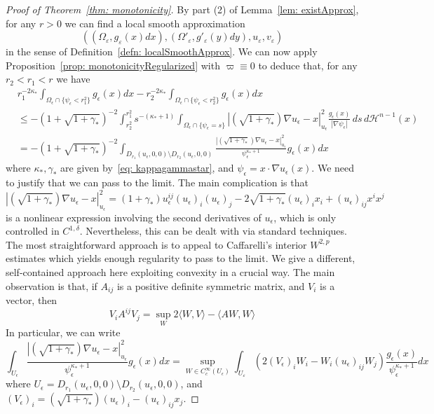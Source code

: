 \documentclass[12pt,reqno]{amsart}
\newcommand{\eps}{\varepsilon}
\numberwithin{equation}{section}
\begin{document}
\begin{proof}[Proof of Theorem~\ref{thm: monotonicity}]
   By part (2) of Lemma~\ref{lem: existApprox}, for any $r>0$ we can find a local smooth approximation 
   \[
   ((\Omega_{\eps}, g_{\eps}(x)dx), (\Omega'_{\eps}, g'_{\eps}(y)dy), u_{\eps}, v_{\eps})
   \]
   in the sense of Definition~\ref{defn: localSmoothApprox}.  We can now apply Proposition~\ref{prop: monotonicityRegularized} with $\varpi \equiv 0$ to deduce that, for any $r_2<r_1 <r$ we have
   \begin{equation}\label{eq: coercivityFormula}
\begin{aligned}
 &r_1^{-2\kappa_{*}}\int_{\Omega_{\epsilon} \cap \{\psi_{\epsilon}<r_1^2\}} g_{\epsilon}(x)dx - r_2^{-2\kappa_{*}}\int_{\Omega_{\epsilon} \cap \{\psi_{\epsilon}<r_2^2\}} g_{\epsilon}(x)dx\\
 &\leq -(1+\sqrt{1+\gamma_*})^{-2}\int_{r_2^2}^{r_1^2}s^{-(\kappa_*+1)}\int_{\Omega_{\epsilon} \cap \{\psi_{\epsilon}=s\}}|(\sqrt{1+\gamma_*})\nabla u_{\epsilon} -x|^2_{u_{\epsilon}}\frac{g_{\epsilon}(x)}{|\nabla \psi_{\epsilon}|}\, ds\, d\mathcal{H}^{n-1}(x)\\
 &=-(1+\sqrt{1+\gamma_*})^{-2}\int_{D_{r_1}(u_{\epsilon},0,0)\setminus D_{r_2}(u_{\epsilon},0,0)}\frac{|(\sqrt{1+\gamma_*})\nabla u_{\epsilon} -x|^2_{u_{\epsilon}}}{\psi_{\epsilon}^{\kappa_*+1}}g_{\epsilon}(x)dx
 \end{aligned}
\end{equation}
where $\kappa_*,\gamma_*$ are given by~\eqref{eq: kappagammastar}, and $\psi_{\epsilon} = x\cdot \nabla u_{\epsilon}(x)$.   We need to justify that we can pass to the limit.  The main complication is that
\[
|(\sqrt{1+\gamma_*})\nabla u_{\epsilon} -x|^2_{u_{\epsilon}}= (1+\gamma_{*})u_{\epsilon}^{ij}(u_{\epsilon})_i(u_{\epsilon})_j -2\sqrt{1+\gamma_*} (u_{\epsilon})_ix_i + (u_{\epsilon})_{ij}x^ix^j
\]
is a nonlinear expression involving the second derivatives of $u_{\epsilon}$, which is only controlled in $C^{1,\delta}$.  Nevertheless, this can be dealt with via standard techniques.  The most straightforward approach is to appeal to Caffarelli's interior $W^{2,p}$ estimates \cite{Caffarelli4} which yields  enough regularity to pass to the limit.  We  give a different, self-contained approach here exploiting convexity in a crucial way.  The main observation is that, if $A_{ij}$ is a positive definite symmetric matrix, and $V_i$ is a vector, then
\[
V_iA^{ij}V_j = \sup_{W} 2\langle W,V\rangle - \langle AW,W \rangle
\]
In particular, we can write
\[
\int_{U_{\epsilon}}\frac{|(\sqrt{1+\gamma_*})\nabla u_{\epsilon} -x|^2_{u_{\epsilon}}}{\psi_{\epsilon}^{\kappa_*+1}}g_{\epsilon}(x)dx= \sup_{W\in C^{\infty}_{c}(U_{\epsilon})}\int_{U_{\eps}} \left(2(V_{\epsilon})_i W_i - W_i(u_{\epsilon})_{ij}W_j\right) \frac{g_{\epsilon}(x)}{\psi_{\epsilon}^{\kappa_*+1}}dx
\]
where $U_{\epsilon} = D_{r_1}(u_{\epsilon},0,0)\setminus D_{r_2}(u_{\epsilon},0,0)$, and $(V_{\epsilon})_i = (\sqrt{1+\gamma_*})(u_{\epsilon})_i -(u_{\epsilon})_{ij}x_j$.



\end{proof}
\end{document}
